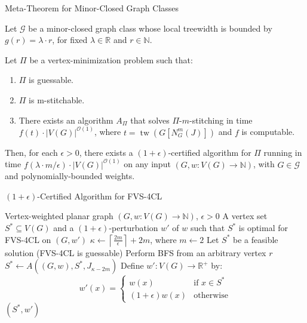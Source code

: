\documentclass{beamer}
\newcommand{\tw}{\operatorname{tw}}
\begin{document}
\begin{frame}{Meta-Theorem for Minor-Closed Graph Classes}

\begin{theorem}
Let $\mathcal{G}$ be a minor-closed graph class whose local treewidth is bounded by $g(r) = \lambda \cdot r$, for fixed $\lambda \in \mathbb{R}$ and $r \in \mathbb{N}$.

Let $\Pi$ be a vertex-minimization problem such that:
\begin{enumerate}
    \item $\Pi$ is guessable.
    \item $\Pi$ is m-stitchable.
    \item There exists an algorithm $A_\Pi$ that solves $\Pi$-$m$-stitching in time 
    $f(t) \cdot |V(G)|^{\mathcal{O}(1)}$, where $t = \tw(G[N_G^m(J)])$ and $f$ is computable.
\end{enumerate}

Then, for each $\epsilon > 0$, there exists a $(1 + \epsilon)$-certified algorithm for $\Pi$ 
running in time $f(\lambda \cdot m / \epsilon) \cdot |V(G)|^{\mathcal{O}(1)}$ on any input 
$(G, w : V(G) \to \mathbb{N})$, with $G \in \mathcal{G}$ and polynomially-bounded weights.
\end{theorem}

\end{frame}

\begin{frame}[fragile]{{$(1+\epsilon)$}-Certified Algorithm for FVS-4CL}
  \begin{algorithm}[H]
    \caption{$(1+\epsilon)$-Certified algorithm for FVS-4CL}
    \begin{algorithmic}[1]
    \REQUIRE Vertex-weighted planar graph $(G, w:V(G) \to \mathbb{N})$, $\epsilon > 0$
    \ENSURE A vertex set $S^* \subseteq V(G)$ and a $(1+\epsilon)$-perturbation $w'$ of $w$ such that $S^*$ is optimal for FVS-4CL on $(G, w')$
    \STATE $\kappa \leftarrow \left\lceil \frac{2m}{\epsilon} \right\rceil + 2m$, where $m \leftarrow 2$
    \STATE Let $S^*$ be a feasible solution (FVS-4CL is guessable)
    \STATE Perform BFS from an arbitrary vertex $r$
        \STATE $S^* \leftarrow A((G,w), S^*, J_{\kappa-2m})$
    \ENDWHILE
    \STATE Define $w': V(G) \rightarrow \mathbb{R}^+$ by:
    \[
    w'(x) = 
    \begin{cases}
    w(x) & \text{if } x \in S^* \\
    (1 + \epsilon)w(x) & \text{otherwise}
    \end{cases}
    \]
    \RETURN $(S^*, w')$
    \end{algorithmic}
  \end{algorithm}
\end{frame}
\end{document}
